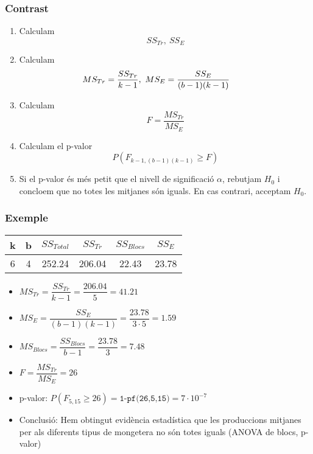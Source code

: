 \documentclass[12pt,t]{beamer}
\renewcommand{\geq}{\geqslant}
\theoremstyle{plain}
\theoremstyle{definition}
\begin{document}
\begin{frame}
\frametitle{Contrast}

\begin{enumerate}
\item Calculam 
$$
SS_{Tr},\ SS_E
$$

\item Calculam 
$$
\hspace*{-5ex} MS_{Tr}=\frac{SS_{Tr}}{k-1},\
MS_E=\frac{SS_E}{(b-1)(k-1)}
$$

\item Calculam 
$$
F=\frac{MS_{Tr}}{MS_E}
$$

\item Calculam el p-valor
$$
P(F_{k-1,(b-1)(k-1)}\geq F)
$$

\item Si el p-valor és més petit que el nivell de significació $\alpha$,  rebutjam $H_0$ i concloem que no totes les mitjanes són iguals. En cas contrari, acceptam $H_0$.
\end{enumerate}
\end{frame}





\begin{frame}
\frametitle{Exemple}

\begin{center}
\begin{tabular}{cccccc}
k & b & $SS_{Total}$ & $SS_{Tr}$ & $SS_{Blocs}$ & $SS_E$\\ \hline
6 & 4 & 252.24  & 206.04 & 22.43  & 23.78
\end{tabular}
\end{center}

\begin{itemize}
\item $MS_{Tr}=\dfrac{SS_{Tr}}{k-1}=\dfrac{206.04}{5}=41.21    $
\medskip

\item $MS_E = \dfrac{SS_E}{(b-1) (k-1)}=\dfrac{23.78}{3\cdot 5}=1.59$
\medskip

\item $MS_{Blocs}=\dfrac{SS_{Blocs}}{b-1}=\dfrac{23.78}{3}=7.48$
\medskip

\item $F=\dfrac{MS_{Tr}}{MS_E}=26$
\medskip

\item p-valor: $P(F_{5,15}\geq 26)=\texttt{1-pf(26,5,15)}=7\cdot 10^{-7}$
\medskip

\item Conclusió: Hem obtingut evidència estadística que les produccions mitjanes per als diferents tipus de mongetera no són totes iguals (ANOVA de blocs, p-valor)

\end{itemize}
\end{frame}
\end{document}
